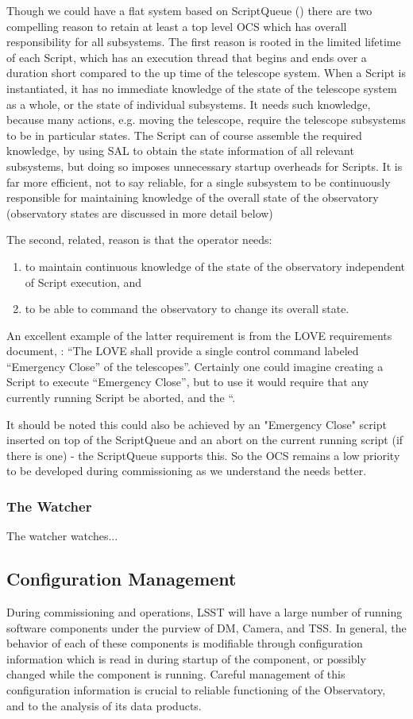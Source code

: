 Though we could have a flat system based on ScriptQueue ()
there are two compelling reason to retain at least a top level OCS which has
overall responsibility for all subsystems. The first reason is rooted in the limited lifetime of each
Script, which has an execution thread that begins and ends over a duration short compared to
the up time of the telescope system. When a Script is instantiated, it has no immediate
knowledge of the state of the telescope system as a whole, or the state of individual
subsystems. It needs such knowledge, because many actions, e.g. moving the telescope,
require the telescope subsystems to be in particular states. The Script can of course assemble
the required knowledge, by using SAL to obtain the state information of all relevant subsystems,
but doing so imposes unnecessary startup overheads for Scripts. It is far more efficient, not to
say reliable, for a single subsystem to be continuously responsible for maintaining knowledge of
the overall state of the observatory (observatory states are discussed in more detail below)

The second, related, reason is that the operator needs:
\begin{enumerate}
\item to maintain continuous knowledge of
the state of the observatory independent of Script execution, and
\item  to be able to command the
observatory to change its overall state.
\end{enumerate}
An excellent example of the latter requirement is from
the LOVE requirements document, : “The LOVE shall provide a single control
command labeled “Emergency Close” of the telescopes”. Certainly one could imagine creating
a Script to execute “Emergency Close”, but to use it would require that any currently running
Script be aborted, and the “.

It should be noted this could also be achieved by an "Emergency Close" script inserted on top of the ScriptQueue and an abort on the current running script (if there is one) - the ScriptQueue supports this.  So the OCS remains a low priority to be developed during commissioning as we understand the needs better.

\subsubsection{The Watcher}\label{sect:watcher}
The watcher watches... 


\subsection{Configuration Management}\label{sect:config}
During commissioning and operations, LSST will have a large number of running software components under the purview of DM, Camera, and TSS. In general, the behavior of each of these components is modifiable through configuration information which is read in during startup of the component, or possibly changed while the component is running. Careful management of this configuration information is crucial to reliable functioning of the Observatory, and to the analysis of its data products.

